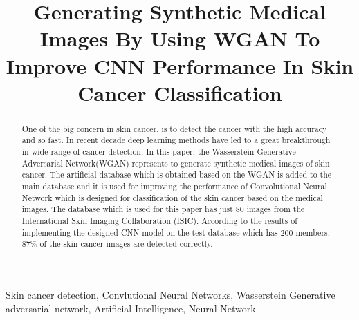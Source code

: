 \documentclass[conference]{IEEEtran}
\begin{document}
\title{Generating Synthetic Medical Images By Using WGAN To Improve CNN  Performance In Skin Cancer Classification}

\author{
\and
{}
\and

}

\maketitle

\begin{abstract}
One of the big concern in skin cancer, is to detect the cancer with the high accuracy and so fast. In recent decade deep learning methods have led to a great breakthrough in wide range of cancer detection. 
In this paper, the Wasserstein Generative Adversarial Network(WGAN) represents to generate synthetic medical images of skin cancer. The artificial database which is obtained based on the WGAN is added to the main database and it is used for improving the performance of Convolutional Neural Network which is designed for classification of the skin cancer based on the medical images. The database which is used for this paper has just 80 images from
the International Skin Imaging Collaboration (ISIC). According to the results of implementing the designed CNN model on the test database which has 200 members, 87\% of the skin cancer images are detected correctly. \\
\end{abstract}

\begin{IEEEkeywords}
Skin cancer detection, Convlutional Neural Networks, Wasserstein Generative adversarial network, Artificial Intelligence, Neural Network
\end{IEEEkeywords}
\end{document}
